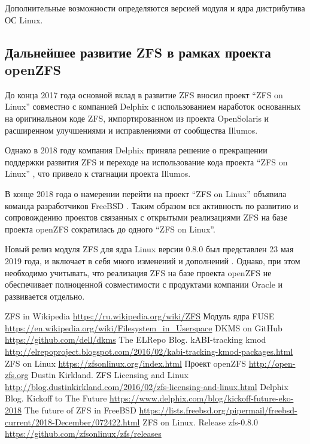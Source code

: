 \documentclass[10pt, a5paper]{article}
\begin{document}
Дополнительные возможности определяются версией модуля и ядра дистрибутива ОС Linux.

\subsection*{Дальнейшее развитие ZFS в рамках проекта \linebreak openZFS}

До конца 2017 года основной вклад в развитие ZFS вносил проект ``ZFS on Linux'' совместно с компанией  Delphix с использованием наработок основанных на оригинальном коде ZFS, импортированном из проекта OpenSolaris и расширенном улучшениями и исправлениями от сообщества Illumos.

Однако в 2018 году компания Delphix приняла решение о прекращении поддержки развития ZFS и переходе на использование кода проекта  ``ZFS on Linux'' \cite{bib8}, что привело к стагнации проекта Illumos.

В конце 2018 года о намерении перейти на проект ``ZFS on Linux'' объявила команда разработчиков FreeBSD \cite{bib9}. Таким образом вся активность по развитию и сопровождению проектов связанных с открытыми реализациями ZFS на базе проекта openZFS сократилась до одного ``ZFS on Linux''.

Новый релиз модуля ZFS для ядра Linux версии 0.8.0 был представлен 23 мая 2019 года, и включает в себя много изменений и дополнений \cite{bib10}. Однако, при этом необходимо учитывать, что реализация ZFS на базе проекта openZFS не обеспечивает полноценной совместимости с продуктами компании Oracle и развивается отдельно.

\begin{thebibliography}{9}
 {ZFS in Wikipedia \url{https://ru.wikipedia.org/wiki/ZFS}}
 {Модуль ядра FUSE \url{https://en.wikipedia.org/wiki/Filesystem_in_Userspace}}
 {DKMS on GitHub \url{https://github.com/dell/dkms}}
 {The ELRepo Blog. kABI-tracking kmod  \url{http://elrepoproject.blogspot.com/2016/02/kabi-tracking-kmod-packages.html}}
 {ZFS on Linux \url{https://zfsonlinux.org/index.html}}
 {Проект openZFS \url{http://open-zfs.org}}
 {Dustin Kirkland. ZFS Licensing and Linux \url{http://blog.dustinkirkland.com/2016/02/zfs-licensing-and-linux.html}}
 {Delphix Blog. Kickoff to The Future \url{https://www.delphix.com/blog/kickoff-future-eko-2018}}
 {The future of ZFS in FreeBSD \url{https://lists.freebsd.org/pipermail/freebsd-current/2018-December/072422.html}}
 {ZFS on Linux. Release zfs-0.8.0 \url{https://github.com/zfsonlinux/zfs/releases}}\end{thebibliography}
\end{document}
